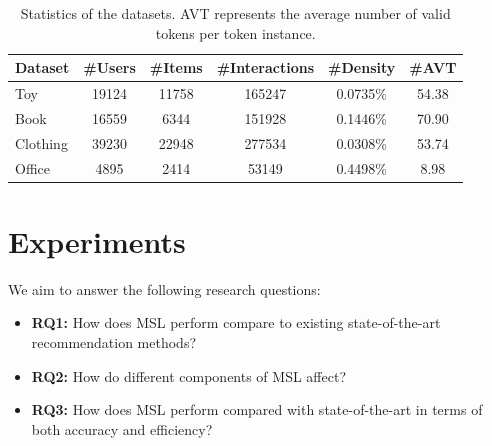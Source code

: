 \documentclass[sigconf,natbib=true]{acmart}
\begin{document}

\begin{table}[]
\centering
\caption{Statistics of the datasets. AVT represents the average number of valid tokens per token instance.}
\label{tab:statistics}
{%
\begin{tabular}{@{}lccccc@{}}
\toprule
Dataset  & \#Users & \#Items & \#Interactions & \#Density & \#AVT  \\ \midrule
Toy      & 19124  & 11758  & 165247        & 0.0735\%  & 54.38 \\
Book     & 16559  & 6344   & 151928        & 0.1446\%  & 70.90 \\
Clothing & 39230  & 22948  & 277534        & 0.0308\%  & 53.74 \\
Office   & 4895   & 2414   & 53149         & 0.4498\%  & 8.98 \\ \bottomrule
\end{tabular}%
}
\end{table}

\section{Experiments}
We aim to answer the following research questions:
\begin{itemize}[left=5pt]
\item \textbf{RQ1:} How does MSL perform compare to existing state-of-the-art recommendation methods?
\item \textbf{RQ2:} How do different components of MSL affect?
\item \textbf{RQ3:} How does MSL perform compared with state-of-the-art in terms of both accuracy and efficiency?
\end{itemize}
\end{document}
